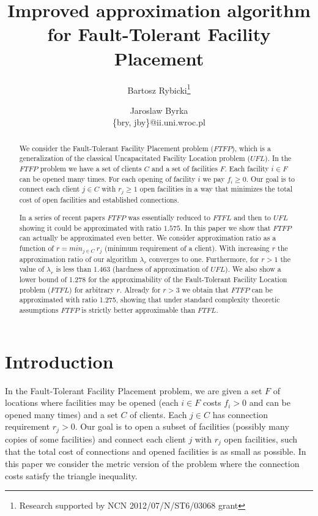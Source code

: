 \documentclass{llncs}
\begin{document}
\title{Improved approximation algorithm for Fault-Tolerant Facility Placement}

\author{Bartosz Rybicki\thanks{Research supported by NCN 2012/07/N/ST6/03068 grant} \and Jaroslaw Byrka\\ \{bry, jby\}@ii.uni.wroc.pl}


\maketitle

\begin{abstract}
We consider the Fault-Tolerant Facility Placement problem ($FTFP$), which is a generalization of the classical Uncapacitated Facility Location problem ($UFL$). In the $FTFP$ problem we have a set of clients $C$ and a set of facilities $F$. Each facility $i \in F$ can be opened many times. For each opening of facility $i$ we pay $f_i \geq 0$. Our goal is to connect each client $j \in C$ with $r_j \geq 1$ open facilities in a way that minimizes the total cost of open facilities and established connections. 

In a series of recent papers $FTFP$ was essentially reduced to $FTFL$ and then to $UFL$ showing it could be approximated with ratio $1.575$. In this paper we show that $FTFP$ can actually be approximated even better. We consider approximation ratio as a function of $r = min_{j \in C}~r_j$ (minimum requirement of a client). With increasing $r$ the approximation ratio of our algorithm $\lambda_r$ converges to one. Furthermore, for $r > 1$ the value of $\lambda_r$ is less than 1.463 (hardness of approximation of $UFL$). We also show a lower bound of 1.278 for the approximability of the Fault-Tolerant Facility Location problem ($FTFL$) for arbitrary $r$. Already for $r > 3$ we obtain that $FTFP$ can be approximated with ratio 1.275, showing that under standard complexity theoretic assumptions $FTFP$ is strictly better approximable than $FTFL$. 
\end{abstract}

\newpage

\section{Introduction}
In the Fault-Tolerant Facility Placement problem, we are given a set $F$ of locations where facilities may be opened (each $i \in F$ costs $f_i > 0$ and can be opened many times) and a set $C$ of clients. Each $j \in C$ has connection requirement $r_j > 0$. Our goal is to open a subset of facilities (possibly many copies of some facilities) and connect each client $j$ with $r_j$ open facilities, such that the total cost of connections and opened facilities is as small as possible. In this paper we consider the metric version of the problem where the connection costs satisfy the triangle inequality.
\end{document}
